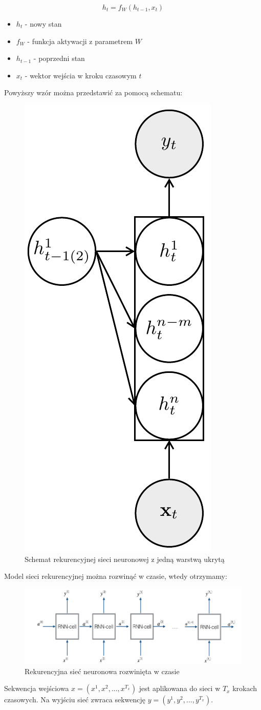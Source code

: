 	\begin{equation}
	h_{t} = f_{W} ( h_{t-1}, x_{t} )
	\end{equation}
	
	\begin{itemize}
		\item $h_{t}$ - nowy stan
		\item $f_{W}$ - funkcja aktywacji z parametrem $W$
		\item $h_{t-1}$ - poprzedni stan
		\item $x_{t}$ - wektor wejścia w kroku czasowym $t$
	\end{itemize}
	
	Powyższy wzór można przedstawić za pomocą schematu:
	
	\begin{figure}[H]
		\centering
		\includegraphics[width=0.2\linewidth]{rnn_model}
		\caption{Schemat rekurencyjnej sieci neuronowej z jedną warstwą ukrytą}
		\label{fig:rnn}
	\end{figure}
	
	Model sieci rekurencyjnej można rozwinąć w czasie, wtedy otrzymamy:
	
 	\begin{figure}[H]
 		\centering
 		\includegraphics[width=0.7\linewidth]{rnn_forward_pass}
 		\caption{Rekurencyjna sieć neuronowa rozwinięta w czasie}
 		\label{fig:rnnforwardpass}
 	\end{figure}
 	
 	 Sekwencja wejściowa $x = (x^{1}, x^{2}, ..., x^{T_{x}})$ jest aplikowana do sieci w $T_{x}$ krokach czasowych. Na wyjściu sieć zwraca sekwencję $y = (y^{1}, y^{2}, ..., y^{T_{x}})$.
	
